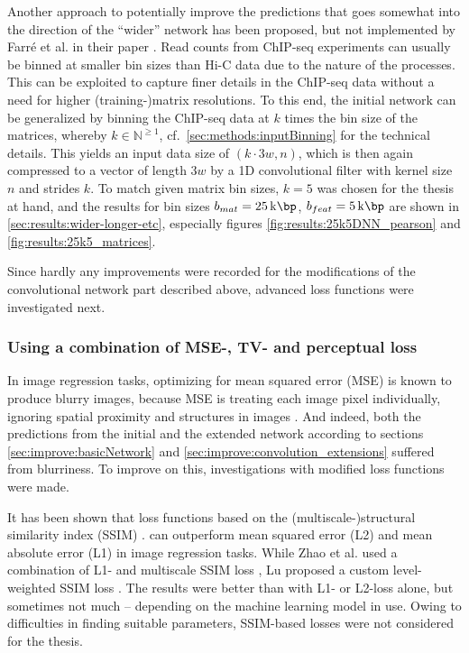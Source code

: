 Another approach to potentially improve the predictions that goes somewhat into
the direction of the ``wider'' network has been proposed, but not implemented by Farr\'e et al. 
in their paper \cite{Farre2018a}.
Read counts from ChIP-seq experiments can usually be binned at smaller bin sizes than Hi-C data due to the nature of 
the processes. 
This can be exploited to capture finer details in the ChIP-seq data without a need for higher (training-)matrix resolutions.
To this end, the initial network can be generalized by binning the ChIP-seq data at $k$ times the bin size of the matrices, 
whereby $k \in \mathbb{N}^{\geq1}$, cf.~\cref{sec:methods:inputBinning} for the technical details.
This yields an input data size of $(k \cdot 3w, n)$, which is then again compressed to a vector of length $3w$ 
by a 1D convolutional filter with kernel size $n$ and strides $k$. 
To match given matrix bin sizes, $k=5$ was chosen for the thesis at hand, 
and the results for bin sizes $b_{mat}=\SI{25}{\kilo\bp}$, $b_{feat}=\SI{5}{\kilo\bp}$ are shown in \cref{sec:results:wider-longer-etc},
especially figures \ref{fig:results:25k5DNN_pearson} and \ref{fig:results:25k5_matrices}.

Since hardly any improvements were recorded for the modifications of the convolutional network part described above,
advanced loss functions were investigated next.

\subsubsection{Using a combination of MSE-, TV- and perceptual loss} \label{sec:improve:combined_loss}
In image regression tasks, optimizing for mean squared error (MSE) is known to produce blurry images,
because MSE is treating each image pixel individually, ignoring spatial proximity and structures in images \cite{Isola2017,Lu2019}.
And indeed, both the predictions from the initial and the extended network according to sections \ref{sec:improve:basicNetwork} and \ref{sec:improve:convolution_extensions} 
suffered from blurriness. 
To improve on this, investigations with modified loss functions were made. 

It has been shown that loss functions based on the (multiscale-)structural similarity index (SSIM) \cite{Wang2003}. 
can outperform mean squared error (L2) and mean absolute error (L1) in image regression tasks.
While Zhao et al. used a combination of L1- and multiscale SSIM loss \cite{Zhao2017},
Lu proposed a custom level-weighted SSIM loss \cite{Lu2019}.
The results were better than with L1- or L2-loss alone, but sometimes not much -- depending on the machine learning model in use.
Owing to difficulties in finding suitable parameters, SSIM-based losses were not considered for the thesis.

